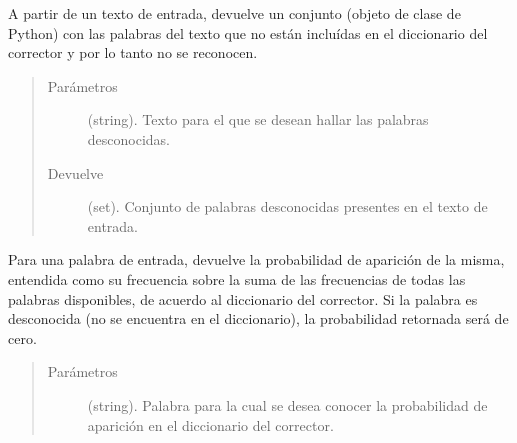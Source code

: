 \documentclass[letterpaper,10pt,openany,spanish]{sphinxmanual}
\begin{document}
\begin{fulllineitems}
\begin{fulllineitems}
\begin{quote}
\begin{description}
\end{description}\end{quote}

\end{fulllineitems}


\begin{fulllineitems}
\label{\detokenize{funciones/correccion:correccion.Corrector.palabras_desconocidas}}
A partir de un texto de entrada, devuelve un conjunto (objeto de clase  de             Python) con las palabras del texto que no están incluídas en             el diccionario del corrector y por lo tanto no se reconocen.
\begin{quote}\begin{description}
\item[{Parámetros}] \leavevmode
{} \textendash{} (string). Texto para el que se desean hallar las palabras desconocidas.

\item[{Devuelve}] \leavevmode
(set). Conjunto de palabras desconocidas presentes en el texto de entrada.

\end{description}\end{quote}

\end{fulllineitems}


\begin{fulllineitems}
\label{\detokenize{funciones/correccion:correccion.Corrector.probabilidad_palabra}}
Para una palabra de entrada, devuelve la probabilidad de aparición de la misma,             entendida como su frecuencia sobre la suma de las frecuencias de todas las palabras            disponibles, de acuerdo al diccionario del corrector. Si la palabra es desconocida             (no se encuentra en el diccionario), la probabilidad retornada será de cero.
\begin{quote}\begin{description}
\item[{Parámetros}] \leavevmode
{} \textendash{} (string). Palabra para la cual se desea conocer la probabilidad             de aparición en el diccionario del corrector.


\end{description}
\end{quote}
\end{fulllineitems}
\end{fulllineitems}
\end{document}
